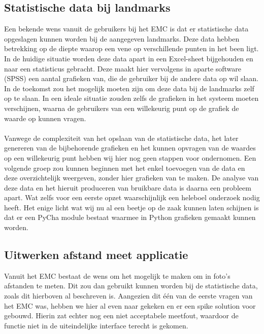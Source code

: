\subsection{Statistische data bij landmarks} %
Een bekende wens vanuit de gebruikers bij het EMC is dat er statistische data opgeslagen kunnen worden bij de aangegeven landmarks.
Deze data hebben betrekking op de diepte waarop een vene op verschillende punten in het been ligt.
In de huidige situatie worden deze data apart in een Excel-sheet bijgehouden en naar een statisticus gebracht.
Deze maakt hier vervolgens in aparte software (SPSS)\cite{spss} een aantal grafieken van, die de gebruiker bij de andere data op wil slaan.
In de toekomst zou het mogelijk moeten zijn om deze data bij de landmarks zelf op te slaan.
In een ideale situatie zouden zelfs de grafieken in het systeem moeten verschijnen, waarna de gebruikers van een willekeurig punt op de grafiek de waarde op kunnen vragen.
\\
\\
Vanwege de complexiteit van het opslaan van de statistische data, het later genereren van de bijbehorende grafieken en het kunnen opvragen van de waardes op een willekeurig punt hebben wij hier nog geen stappen voor ondernomen.
Een volgende groep zou kunnen beginnen met het enkel toevoegen van de data en deze overzichtelijk weergeven, zonder hier grafieken van te maken.
De analyse van deze data en het hieruit produceren van bruikbare data is daarna een probleem apart.
Wat zelfs voor een eerste opzet waarschijnlijk een heleboel onderzoek nodig heeft.
Het enige licht wat wij nu al een beetje op de zaak kunnen laten schijnen is dat er een PyCha module bestaat waarmee in Python grafieken gemaakt kunnen worden.

\subsection{Uitwerken afstand meet applicatie} %
\label{customjaap}
Vanuit het EMC bestaat de wens om het mogelijk te maken om in foto's afstanden te meten.
Dit zou dan gebruikt kunnen worden bij de statistische data, zoals dit hierboven al beschreven is.
Aangezien dit \'{e}\'{e}n van de eerste vragen van het EMC was, hebben we hier al even naar gekeken en er een spike solution voor gebouwd.
Hierin zat echter nog een niet acceptabele meetfout, waardoor de functie niet in de uiteindelijke interface terecht is gekomen.

